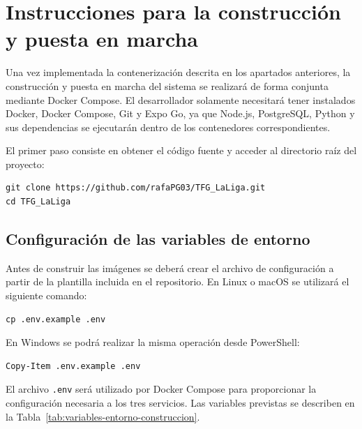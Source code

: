\section{Instrucciones para la construcci\'on y puesta en marcha}

Una vez implementada la contenerizaci\'on descrita en los apartados anteriores,
la construcci\'on y puesta en marcha del sistema se realizar\'a de forma conjunta
mediante Docker Compose. El desarrollador solamente necesitar\'a tener instalados
Docker, Docker Compose, Git y Expo Go, ya que Node.js, PostgreSQL, Python y sus
dependencias se ejecutar\'an dentro de los contenedores correspondientes.

El primer paso consiste en obtener el c\'odigo fuente y acceder al directorio ra\'iz
del proyecto:

\begin{lstlisting}
git clone https://github.com/rafaPG03/TFG_LaLiga.git
cd TFG_LaLiga
\end{lstlisting}

\subsection{Configuraci\'on de las variables de entorno}

Antes de construir las im\'agenes se deber\'a crear el archivo de configuraci\'on
a partir de la plantilla incluida en el repositorio. En Linux o macOS se utilizar\'a
el siguiente comando:

\begin{lstlisting}
cp .env.example .env
\end{lstlisting}

En Windows se podr\'a realizar la misma operaci\'on desde PowerShell:

\begin{lstlisting}
Copy-Item .env.example .env
\end{lstlisting}

El archivo \texttt{.env} ser\'a utilizado por Docker Compose para proporcionar la
configuraci\'on necesaria a los tres servicios. Las variables previstas se describen
en la Tabla~\ref{tab:variables-entorno-construccion}.

